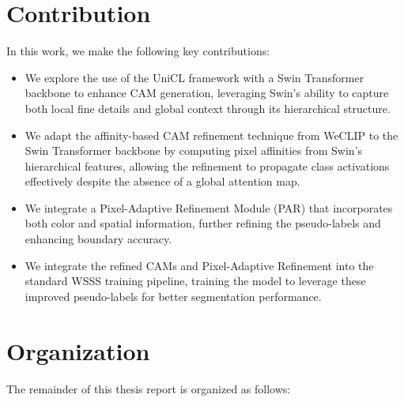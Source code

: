\section{Contribution}
\label{sec:contribution}

In this work, we make the following key contributions:

\begin{itemize}
    \item We explore the use of the UniCL framework \cite{vl_unicl} with a Swin Transformer backbone \cite{transformer_swin} to enhance CAM generation, leveraging Swin's ability to capture both local fine details and global context through its hierarchical structure.
    \item We adapt the affinity-based CAM refinement technique from WeCLIP \cite{wsss_frozen_clip} to the Swin Transformer backbone by computing pixel affinities from Swin's hierarchical features, allowing the refinement to propagate class activations effectively despite the absence of a global attention map.
    \item We integrate a Pixel-Adaptive Refinement Module (PAR) \cite{wsss_afa_affinity_from_attention} that incorporates both color and spatial information, further refining the pseudo-labels and enhancing boundary accuracy.
    \item We integrate the refined CAMs and Pixel-Adaptive Refinement into the standard WSSS training pipeline, training the model to leverage these improved pseudo-labels for better segmentation performance.

\end{itemize}

\section{Organization}
\label{sec:organization}

The remainder of this thesis report is organized as follows:

